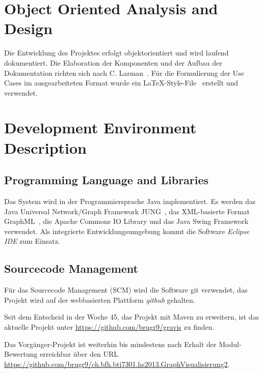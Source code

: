 \section{Object Oriented Analysis and Design}
\label{sec:Object Oriented Analysis and Design}
Die Entwicklung des Projektes erfolgt objektorientiert und wird laufend dokumentiert. Die Elaboration der Komponenten und der Aufbau der Dokumentation richten sich nach C. Larman~\cite{larmann:2004}. F\"ur die Formulierung der Use Cases im ausgearbeiteten Format wurde ein \LaTeX-Style-File~\cite{bruggmann:2013} erstellt und verwendet.
% 
\section{Development Environment Description}
\label{sec:Development Environment Description}
% 
\subsection{Programming Language and Libraries}
\label{subsec:Programming Language and Libraries}
Das System wird in der Programmiersprache Java implementiert. Es werden das Java Universal Network/Graph Framework JUNG~\cite{jung:2013}, das XML-basierte Format GraphML~\cite{graphml:2013}, die Apache Commons IO Library und das Java Swing Framework verwendet. Als integrierte Entwicklungsumgebung kommt die Software \textit{Eclipse IDE} zum Einsatz.
% 
\subsection{Sourcecode Management}
\label{subsec:Sourcecode Management}
F\"ur das Sourcecode Management (SCM) wird die Software git verwendet, das Projekt wird auf der webbasierten Plattform \textit{github} gehalten.

Seit dem Entscheid in der Woche 45, das Projekt mit Maven zu erweitern, ist das aktuelle Projekt unter \url{https://github.com/brugr9/gravis} zu finden.

Das Vorg\"anger-Projekt ist weiterhin bis mindestens nach Erhalt der Modul-Bewertung erreichbar \"uber den URL \url{https://github.com/brugr9/ch.bfh.bti7301.hs2013.GraphVisualisierung2}.